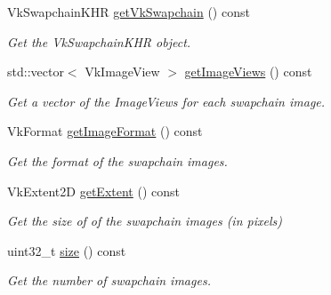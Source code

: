 \begin{DoxyCompactItemize}
\mbox{\label{class_swapchain_a9f3e59bd2233d0f31998bd12ca4dbd50}} 
Vk\+Swapchain\+K\+HR \mbox{\hyperlink{class_swapchain_a9f3e59bd2233d0f31998bd12ca4dbd50}{get\+Vk\+Swapchain}} () const
\begin{DoxyCompactList}\small\item\em Get the Vk\+Swapchain\+K\+HR object. \end{DoxyCompactList}\item 
\mbox{\label{class_swapchain_a3ff41524e879e526875a48915f7b3ae2}} 
std\+::vector$<$ Vk\+Image\+View $>$ \mbox{\hyperlink{class_swapchain_a3ff41524e879e526875a48915f7b3ae2}{get\+Image\+Views}} () const
\begin{DoxyCompactList}\small\item\em Get a vector of the Image\+Views for each swapchain image. \end{DoxyCompactList}\item 
\mbox{\label{class_swapchain_a00bf8612221b76cb057f790931480bda}} 
Vk\+Format \mbox{\hyperlink{class_swapchain_a00bf8612221b76cb057f790931480bda}{get\+Image\+Format}} () const
\begin{DoxyCompactList}\small\item\em Get the format of the swapchain images. \end{DoxyCompactList}\item 
\mbox{\label{class_swapchain_af66a7ddb38ff86f003096054de1cf672}} 
Vk\+Extent2D \mbox{\hyperlink{class_swapchain_af66a7ddb38ff86f003096054de1cf672}{get\+Extent}} () const
\begin{DoxyCompactList}\small\item\em Get the size of of the swapchain images (in pixels) \end{DoxyCompactList}\item 
\mbox{\label{class_swapchain_ab2fd76c1f1f94eff758025cad425108e}} 
uint32\+\_\+t \mbox{\hyperlink{class_swapchain_ab2fd76c1f1f94eff758025cad425108e}{size}} () const
\begin{DoxyCompactList}\small\item\em Get the number of swapchain images. \end{DoxyCompactList}\end{DoxyCompactItemize}
